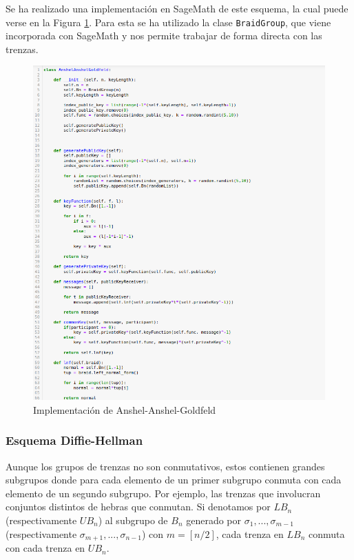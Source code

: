 \documentclass[12pt]{book}
\theoremstyle{definition}
\begin{document}
Se ha realizado una implementación en SageMath de este esquema, la cual puede verse en la Figura \ref{img:imp_anshel}. Para esta se ha utilizado la clase \texttt{BraidGroup}, que viene incorporada con SageMath y nos permite trabajar de forma directa con las trenzas.

\begin{figure}
\includegraphics[scale=0.5]{imgs/Anshel.png}
\caption{Implementación de Anshel-Anshel-Goldfeld}
\label{img:imp_anshel}
\end{figure}



\subsubsection*{Esquema Diffie-Hellman} Aunque los grupos de trenzas no son conmutativos, estos contienen grandes subgrupos donde para cada elemento de un primer subgrupo conmuta con cada elemento de un segundo subgrupo. Por ejemplo, las trenzas que involucran conjuntos distintos de hebras que conmutan. Si denotamos por $LB_n$ (respectivamente $UB_n$) al subgrupo de $B_n$ generado por $\sigma_1,...,\sigma_{m-1}$ (respectivamente $\sigma_{m+1},...,\sigma_{n-1}$) con $m=[n/2]$, cada trenza en $LB_n$ conmuta con cada trenza en $UB_n$.
\end{document}
